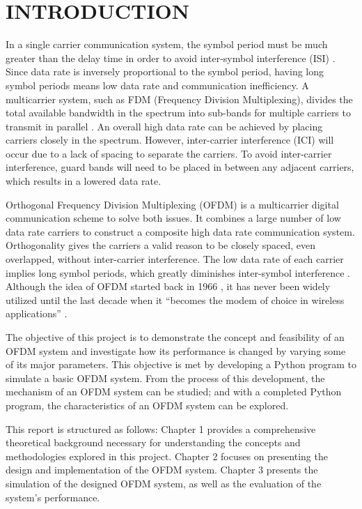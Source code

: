 \section*{INTRODUCTION}

In a single carrier communication system, the symbol period must be much greater than the delay time in order to avoid inter-symbol interference (ISI) \cite{b1}. Since data rate is inversely proportional to the symbol period, having long symbol periods means low data rate and communication inefficiency. A multicarrier system, such as FDM (Frequency Division Multiplexing), divides the total available bandwidth in the spectrum into sub-bands for multiple carriers to transmit in parallel \cite{b2}. An overall high data rate can be achieved by placing carriers closely in the spectrum. However, inter-carrier interference (ICI) will occur due to a lack of spacing to separate the carriers. To avoid inter-carrier interference, guard bands will need to be placed in between any adjacent carriers, which results in a lowered data rate.

Orthogonal Frequency Division Multiplexing (OFDM) is a multicarrier digital communication scheme to solve both issues. It combines a large number of low data rate carriers to construct a composite high data rate communication system. Orthogonality gives the carriers a valid reason to be closely spaced, even overlapped, without inter-carrier interference. The low data rate of each carrier implies long symbol periods, which greatly diminishes inter-symbol interference \cite{b3}. Although the idea of OFDM started back in 1966 \cite{b4}, it has never been widely utilized until the last decade when it “becomes the modem of choice in wireless applications” \cite{b5}.

The objective of this project is to demonstrate the concept and feasibility of an OFDM system and investigate how its performance is changed by varying some of its major parameters. This objective is met by developing a Python program to simulate a basic OFDM system. From the process of this development, the mechanism of an OFDM system can be studied; and with a completed Python program, the characteristics of an OFDM system can be explored.

This report is structured as follows: Chapter 1 provides a comprehensive theoretical background necessary for understanding the concepts and methodologies explored in this project. Chapter 2 focuses on presenting the design and implementation of the OFDM system. Chapter 3 presents the simulation of the designed OFDM system, as well as the evaluation of the system's performance.